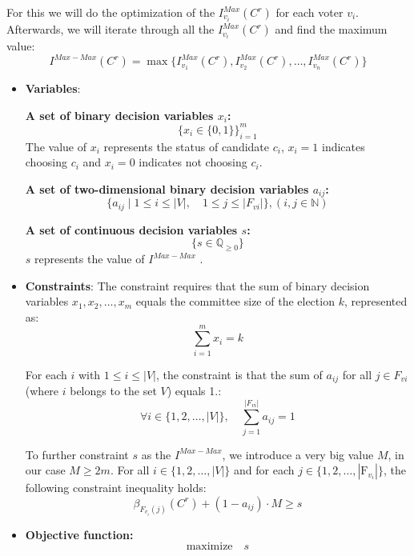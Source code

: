 \documentclass{article}
\begin{document}
For this we will do the optimization of the $I_{v_i}^{Max}(C^{r})$ for each voter $v_i$. Afterwards, we will iterate through all the $I_{v_i}^{Max}(C^{r})$ and find the maximum value:
  \[I^{Max-Max}(C^{r}) = \max\{ I_{v_1}^{Max}(C^{r}), I_{v_2}^{Max}(C^{r}), \ldots, I_{v_n}^{Max}(C^{r}) \}\]
\begin{itemize}

  \item \textbf{Variables}: 

\textbf{A set of binary decision variables $x_i$:} \[ \bigg\{ x_i \in \{0, 1\} \bigg\}_{i=1}^m \] The value of $x_i$ represents the status of candidate $c_i$, \(x_i = 1\) indicates choosing $c_i$ and \(x_i = 0\) indicates not choosing $c_i$.


\textbf{A set of two-dimensional binary decision variables \( a_{ij} \):}
\[
\{ a_{ij} \mid 1 \leq i \leq |V|, \quad 1 \leq j \leq |F_{vi}| \},  (i, j \in \mathbb{N})
\]

\textbf{A set of continuous decision variables $s$:} 
\[ \bigg\{ s \in \mathbb{Q}_{\geq 0} \bigg\} \] 
$s$ represents the value of $I^{Max-Max}$ .
    \item \textbf{Constraints}:
The constraint requires that the sum of binary decision variables \(x_1, x_2, \ldots, x_m\) equals the committee size of the election \(k\), represented as:
\begin{equation} \sum_{i=1}^m x_i = k     \label{eq:ilpmaxmax1}
\end{equation}

For each \(i\) with \(1 \leq i \leq |V|\), the constraint is that the sum of \( a_{ij} \) for all \( j \in F_{vi} \) (where \( i \) belongs to the set \( V \)) equals 1.:
\begin{equation} \forall i \in \{1, 2, \ldots, |V|\}, \quad \sum_{j=1}^{|F_{vi}|} a_{ij} = 1  \label{eq:ilpmaxmax2}
\end{equation}

To further constraint $s$ as the $I^{Max-Max}$, we introduce a very big value $M$, in our case $M \geq  2m$. For all \( i \in \{1, 2, \ldots, |V|\} \) and for each  \( j \in \{1, 2, \ldots, |\text{F}_{v_i}|\} \), the following constraint inequality holds:
\begin{equation} \beta_{F_{v_i}(j)}(C^{r}) + (1 - a_{ij})\cdot M \geq s \label{eq:ilpmaxmax3}
\end{equation}
  
  \item  \textbf{Objective function:}
  \[\text{maximize} \quad s \]


\end{itemize}
\end{document}
